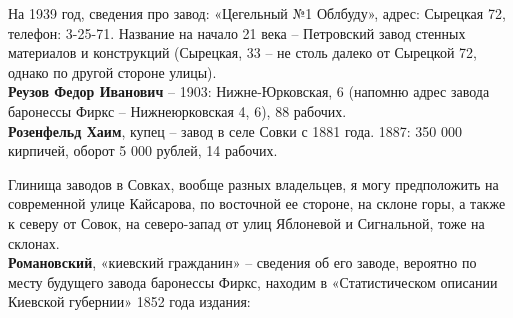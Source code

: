 На 1939 год, сведения про завод: «Цегельный №1 Облбуду», адрес: Сырецкая 72, телефон: 3-25-71. Название на начало 21 века – Петровский завод стенных материалов и конструкций (Сырецкая, 33 – не столь далеко от Сырецкой 72, однако по другой стороне улицы).\\ 

\noindent\textbf{Реузов Федор Иванович} – 1903: Нижне-Юрковская, 6 (напомню адрес завода баронессы Фиркс – Нижнеюрковская 4, 6), 88 рабочих.\\

\noindent\textbf{Розенфельд Хаим}, купец – завод в селе Совки с 1881 года. 1887: 350 000 кирпичей, оборот 5 000 рублей, 14 рабочих.

Глинища заводов в Совках, вообще разных владельцев, я могу предположить на современной улице Кайсарова, по восточной ее стороне, на склоне горы, а также к северу от Совок, на северо-запад от улиц Яблоневой и Сигнальной, тоже на склонах.\\

\noindent\textbf{Романовский}, «киевский гражданин» – сведения об его заводе, вероятно по месту будущего завода баронессы Фиркс, находим в «Статистическом описании Киевской губернии»\cite{fundstat} 1852 года издания:

